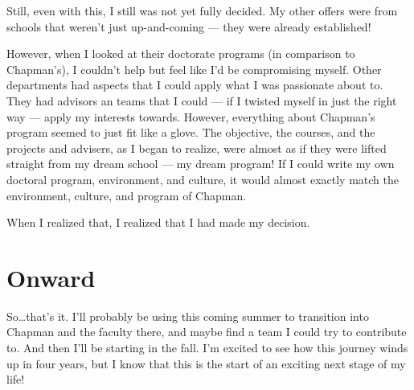 \documentclass[]{article}
\begin{document}
Still, even with this, I still was not yet fully decided. My other
offers were from schools that weren't just up-and-coming --- they were
already established!

However, when I looked at their doctorate programs (in comparison to
Chapman's), I couldn't help but feel like I'd be compromising myself.
Other departments had aspects that I could apply what I was passionate
about to. They had advisors an teams that I could --- if I twisted
myself in just the right way --- apply my interests towards. However,
everything about Chapman's program seemed to just fit like a glove. The
objective, the courses, and the projects and advisers, as I began to
realize, were almost as if they were lifted straight from my dream
school --- my dream program! If I could write my own doctoral program,
environment, and culture, it would almost exactly match the environment,
culture, and program of Chapman.

When I realized that, I realized that I had made my decision.

\section{Onward}\label{onward}

So\ldots{}that's it. I'll probably be using this coming summer to
transition into Chapman and the faculty there, and maybe find a team I
could try to contribute to. And then I'll be starting in the fall. I'm
excited to see how this journey winds up in four years, but I know that
this is the start of an exciting next stage of my life!
\end{document}
